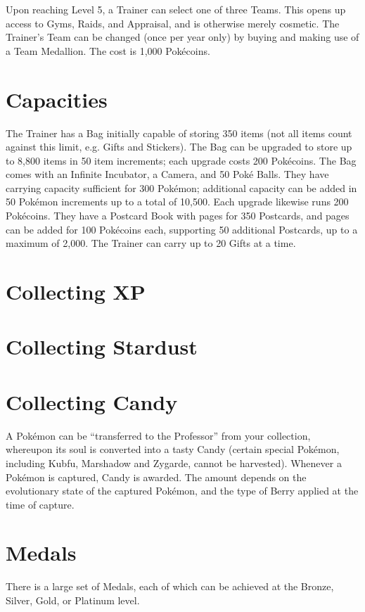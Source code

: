 Upon reaching Level 5, a Trainer can select one of three Teams.
This opens up access to Gyms, Raids, and Appraisal, and is otherwise
 merely cosmetic.
The Trainer's Team can be changed (once per year only) by buying and
 making use of a Team Medallion.
The cost is 1,000 Pokécoins.

\section{Capacities}
The Trainer has a Bag initially capable of storing 350 items (not all items
  count against this limit, e.g. Gifts and Stickers).
The Bag can be upgraded to store up to 8,800 items in 50 item increments;
  each upgrade costs 200 Pokécoins.
The Bag comes with an Infinite Incubator, a Camera, and 50 Poké Balls.
They have carrying capacity sufficient for 300 Pokémon; additional
  capacity can be added in 50 Pokémon increments up to a total
  of 10,500.
Each upgrade likewise runs 200 Pokécoins.
They have a Postcard Book with pages for 350 Postcards, and pages can be
 added for 100 Pokécoins each, supporting 50 additional Postcards, up
 to a maximum of 2,000.
The Trainer can carry up to 20 Gifts at a time.

\section{Collecting XP}

\section{Collecting Stardust}

\section{Collecting Candy}
A Pokémon can be ``transferred to the Professor'' from your collection,
 whereupon its soul is converted into a tasty Candy (certain special
 Pokémon, including Kubfu, Marshadow and Zygarde, cannot be harvested).
Whenever a Pokémon is captured, Candy is awarded. The amount depends on
 the evolutionary state of the captured Pokémon, and the type of Berry
 applied at the time of capture.

\section{Medals}
There is a large set of Medals, each of which can be achieved at the Bronze,
 Silver, Gold, or Platinum level.

